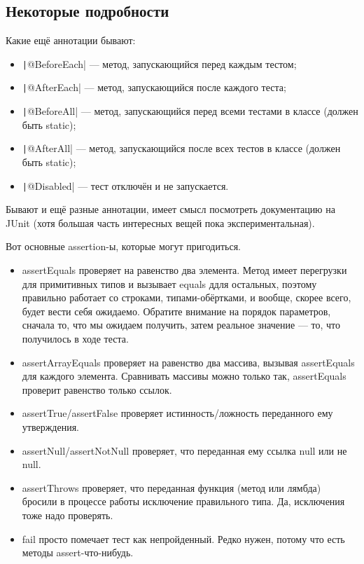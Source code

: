 \documentclass[a5paper]{article}
\begin{document}
\subsection{Некоторые подробности}

Какие ещё аннотации бывают:
\begin{itemize}
	\item \texttt|@BeforeEach| --- метод, запускающийся перед каждым тестом;
	\item \texttt|@AfterEach| --- метод, запускающийся после каждого теста;
	\item \texttt|@BeforeAll| --- метод, запускающийся перед всеми тестами в классе (должен быть static);
	\item \texttt|@AfterAll| --- метод, запускающийся после всех тестов в классе (должен быть static);
	\item \texttt|@Disabled| --- тест отключён и не запускается.
\end{itemize}

Бывают и ещё разные аннотации, имеет смысл посмотреть документацию на JUnit (хотя большая часть интересных вещей пока экспериментальная).

Вот основные assertion-ы, которые могут пригодиться.

\begin{itemize}
	\item assertEquals проверяет на равенство два элемента. Метод имеет перегрузки для примитивных типов и вызывает equals ддля остальных, поэтому правильно работает со строками, типами-обёртками, и вообще, скорее всего, будет вести себя ожидаемо. Обратите внимание на порядок параметров, сначала то, что мы ожидаем получить, затем реальное значение --- то, что получилось в ходе теста.
	\item assertArrayEquals проверяет на равенство два массива, вызывая assertEquals для каждого элемента. Сравнивать массивы можно только так, assertEquals проверит равенство только ссылок.
	\item assertTrue/assertFalse проверяет истинность/ложность переданного ему утверждения.
	\item assertNull/assertNotNull проверяет, что переданная ему ссылка null или не null.
	\item assertThrows проверяет, что переданная функция (метод или лямбда) бросили в процессе работы исключение правильного типа. Да, исключения тоже надо проверять.
	\item fail просто помечает тест как непройденный. Редко нужен, потому что есть методы assert-что-нибудь.
\end{itemize}
\end{document}
